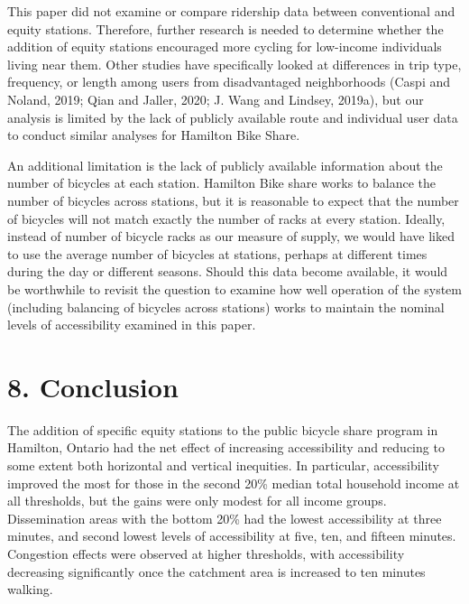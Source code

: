 \documentclass[]{elsarticle} %
\begin{document}
This paper did not examine or compare ridership data between
conventional and equity stations. Therefore, further research is needed
to determine whether the addition of equity stations encouraged more
cycling for low-income individuals living near them. Other studies have
specifically looked at differences in trip type, frequency, or length
among users from disadvantaged neighborhoods (Caspi and Noland, 2019;
Qian and Jaller, 2020; J. Wang and Lindsey, 2019a), but our analysis is
limited by the lack of publicly available route and individual user data
to conduct similar analyses for Hamilton Bike Share.

An additional limitation is the lack of publicly available information
about the number of bicycles at each station. Hamilton Bike share works
to balance the number of bicycles across stations, but it is reasonable
to expect that the number of bicycles will not match exactly the number
of racks at every station. Ideally, instead of number of bicycle racks
as our measure of supply, we would have liked to use the average number
of bicycles at stations, perhaps at different times during the day or
different seasons. Should this data become available, it would be
worthwhile to revisit the question to examine how well operation of the
system (including balancing of bicycles across stations) works to
maintain the nominal levels of accessibility examined in this paper.

\hypertarget{conclusion}{%
\section{8. Conclusion}\label{conclusion}}

The addition of specific equity stations to the public bicycle share
program in Hamilton, Ontario had the net effect of increasing
accessibility and reducing to some extent both horizontal and vertical
inequities. In particular, accessibility improved the most for those in
the second 20\% median total household income at all thresholds, but the
gains were only modest for all income groups. Dissemination areas with
the bottom 20\% had the lowest accessibility at three minutes, and
second lowest levels of accessibility at five, ten, and fifteen minutes.
Congestion effects were observed at higher thresholds, with
accessibility decreasing significantly once the catchment area is
increased to ten minutes walking.
\end{document}
